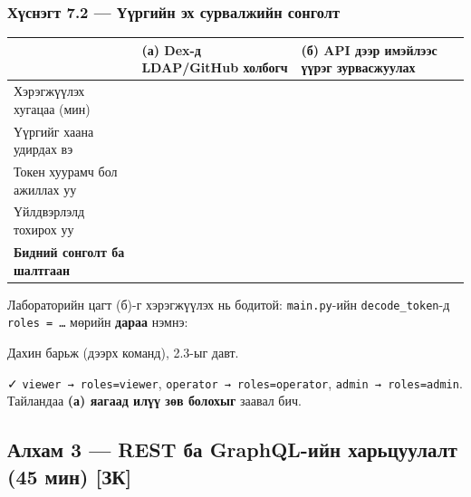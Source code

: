 \hypertarget{ux445ux4afux441ux43dux44dux433ux442-7.2-ux4afux4afux440ux433ux438ux439ux43d-ux44dux445-ux441ux443ux440ux432ux430ux43bux436ux438ux439ux43d-ux441ux43eux43dux433ux43eux43bux442}{%
\subsubsection{Хүснэгт 7.2 --- Үүргийн эх сурвалжийн сонголт}\label{ux445ux4afux441ux43dux44dux433ux442-7.2-ux4afux4afux440ux433ux438ux439ux43d-ux44dux445-ux441ux443ux440ux432ux430ux43bux436ux438ux439ux43d-ux441ux43eux43dux433ux43eux43bux442}}

\begingroup\scriptsize\begin{longtable}[]{@{}lll@{}}
\toprule
& (а) Dex-д LDAP/GitHub холбогч & (б) API дээр имэйлээс үүрэг зурвасжуулах\tabularnewline
\midrule
\endhead
Хэрэгжүүлэх хугацаа (мин) & &\tabularnewline
Үүргийг хаана удирдах вэ & &\tabularnewline
Токен хуурамч бол ажиллах уу & &\tabularnewline
Үйлдвэрлэлд тохирох уу & &\tabularnewline
\textbf{Бидний сонголт ба шалтгаан} & &\tabularnewline
\bottomrule
\end{longtable}\endgroup

Лабораторийн цагт (б)-г хэрэгжүүлэх нь бодитой: \texttt{main.py}-ийн \texttt{decode\_token}-д \texttt{roles\ =\allowbreak{}\ \ldots{}} мөрийн \textbf{дараа} нэмнэ:

\begin{Shaded}
\begin{Highlighting}[]
\OperatorTok{=}\NormalTok{, }\NormalTok{)}
    \NormalTok{):}
\OperatorTok{=}\NormalTok{ [}\NormalTok{]}
    \NormalTok{):}
\OperatorTok{=}\NormalTok{ [}\NormalTok{]}
\end{Highlighting}
\end{Shaded}

Дахин барьж (дээрх команд), 2.3-ыг давт.

✓ \texttt{viewer\ →\ roles=\allowbreak{}viewer}, \texttt{operator\ →\ roles=\allowbreak{}operator}, \texttt{admin\ →\ roles=\allowbreak{}admin}. Тайландаа \textbf{(а) яагаад илүү зөв болохыг} заавал бич.

\hypertarget{ux430ux43bux445ux430ux43c-3-rest-ux431ux430-graphql-ux438ux439ux43d-ux445ux430ux440ux44cux446ux443ux443ux43bux430ux43bux442-45-ux43cux438ux43d-ux437ux43a}{%
\subsection{Алхам 3 --- REST ба GraphQL-ийн харьцуулалт (45 мин) {[}ЗК{]}}\label{ux430ux43bux445ux430ux43c-3-rest-ux431ux430-graphql-ux438ux439ux43d-ux445ux430ux440ux44cux446ux443ux443ux43bux430ux43bux442-45-ux43cux438ux43d-ux437ux43a}}

